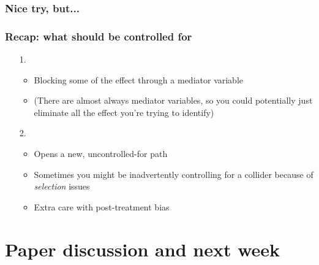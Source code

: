\documentclass[aspectratio=43]{beamer}
\begin{document}
\begin{frame}
\frametitle{Nice try, but...}
\centering


\end{frame}

\begin{frame}
\frametitle{Recap: what should  be controlled for}
\centering

\begin{itemize}
  \item[1.] 
  \begin{itemize}
    \item Blocking some of the effect through a mediator variable
    \item (There are almost always mediator variables, so you could potentially just eliminate all the effect you're trying to identify)
  \end{itemize}
  \item[]
  \item[2.] 
  \begin{itemize}
    \item Opens a new, uncontrolled-for path
    \item Sometimes you might be inadvertently controlling for a collider because of \textit{selection} issues
    \item Extra care with post-treatment bias
  \end{itemize}
\end{itemize}

\end{frame}

\section{Paper discussion and next week}
\end{document}
